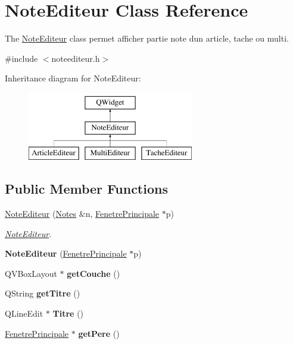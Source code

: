 \hypertarget{class_note_editeur}{}\section{Note\+Editeur Class Reference}
\label{class_note_editeur}


The \hyperlink{class_note_editeur}{Note\+Editeur} class permet afficher partie note d\textquotesingle{}un article, tache ou multi.  




{\ttfamily \#include $<$noteediteur.\+h$>$}

Inheritance diagram for Note\+Editeur\+:\begin{figure}[H]
\begin{center}
\leavevmode
\includegraphics[height=3.000000cm]{class_note_editeur}
\end{center}
\end{figure}
\subsection*{Public Member Functions}
\begin{DoxyCompactItemize}
\item 
\hyperlink{class_note_editeur_a5488a0e9553714cf8232f9ca56305e23}{Note\+Editeur} (\hyperlink{class_notes}{Notes} \&n, \hyperlink{class_fenetre_principale}{Fenetre\+Principale} $\ast$p)
\begin{DoxyCompactList}\small\item\em \hyperlink{class_note_editeur}{Note\+Editeur}. \end{DoxyCompactList}\item 
\mbox{\label{class_note_editeur_ae4689219a596cc159e22d524fea6c995}} 
{\bfseries Note\+Editeur} (\hyperlink{class_fenetre_principale}{Fenetre\+Principale} $\ast$p)
\item 
\mbox{\label{class_note_editeur_a438c4a989e222d3fcbd04fd960e24776}} 
Q\+V\+Box\+Layout $\ast$ {\bfseries get\+Couche} ()
\item 
\mbox{\label{class_note_editeur_a5b1566a2019f8717a4648e61997ad058}} 
Q\+String {\bfseries get\+Titre} ()
\item 
\mbox{\label{class_note_editeur_aab9454ecfabe432c22e54d531b716b0c}} 
Q\+Line\+Edit $\ast$ {\bfseries Titre} ()
\item 
\mbox{\label{class_note_editeur_a0d713ee7aae120ceac4388ac6de269f8}} 
\hyperlink{class_fenetre_principale}{Fenetre\+Principale} $\ast$ {\bfseries get\+Pere} ()
\end{DoxyCompactItemize}


